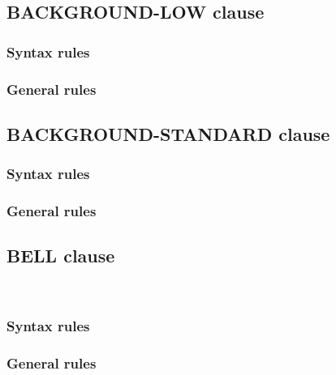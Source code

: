 \subsection{BACKGROUND-LOW clause}

\begin{syntax}[\miscextcolour]
\end{syntax}

\subsubsection{Syntax rules}

\subsubsection{General rules}

\subsection{BACKGROUND-STANDARD clause}

\begin{syntax}[\miscextcolour]
\end{syntax}

\subsubsection{Syntax rules}

\subsubsection{General rules}

\subsection{BELL clause}

\begin{syntax}
  \begin{1=}
     \\
  \end{1=}
\end{syntax}

\subsubsection{Syntax rules}

\subsubsection{General rules}

